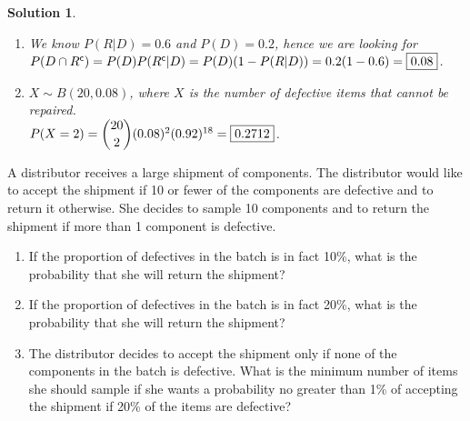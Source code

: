 \documentclass[11pt]{article}
\newtheorem*{solution}{Solution}
\theoremstyle{mystyle}
\newtheorem{pproblem}{Problem}
\begin{document}
\begin{solution}
    \leavevmode
    \begin{enumerate}[label=\alph*.]
        \item We know $P(R|D)=0.6$ and $P(D)=0.2$, hence we are looking for $P(D \cap R^{\mathsf{c}}) = P(D)P(R^{\mathsf{c}}|D) 
        = P(D)(1-P(R|D))= 0.2(1-0.6) = \boxed{0.08}$.
        \item $X \sim B(20,0.08)$, where $X$ is the number of defective items that cannot be repaired.
        \\ $P(X=2)=\dbinom{20}{2} (0.08)^2 (0.92)^{18} = \boxed{0.2712}$.
    \end{enumerate}
\end{solution}

\begin{psproblem}{}{}
    A distributor receives a large shipment of components. The distributor would like to accept the shipment if 10
    or fewer of the components are defective and to return it otherwise. She decides to sample 10 components and to
    return the shipment if more than 1 component is defective.
    \begin{enumerate}[label=\alph*.]
        \item If the proportion of defectives in the batch is in fact 10\%, what is the probability that she will return the
        shipment?
        \item If the proportion of defectives in the batch is in fact 20\%, what is the probability that she will return the
        shipment?
        \item The distributor decides to accept the shipment only if none of the components in the batch is defective. What
        is the minimum number of items she should sample if she wants a probability no greater than 1\% of accepting
        the shipment if 20\% of the items are defective?
    \end{enumerate}
\end{psproblem}





%
%
\end{document}
